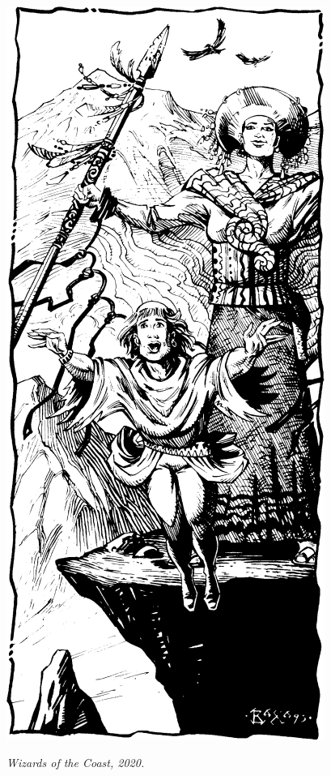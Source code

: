\begin{figure}[t!]
\centering
\includegraphics[width=\columnwidth]{images/cleric-1.png}
\par\textit{\small\textcopyright Wizards of the Coast, 2020.}
\end{figure}

